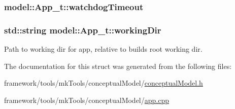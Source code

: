 \subsubsection[{\texorpdfstring{watchdog\+Timeout}{watchdogTimeout}}]{ model\+::\+App\+\_\+t\+::watchdog\+Timeout}\hypertarget{structmodel_1_1_app__t_ab1f362e168c428268f8cbf63b1fa4b49}{}\label{structmodel_1_1_app__t_ab1f362e168c428268f8cbf63b1fa4b49}
\subsubsection[{\texorpdfstring{working\+Dir}{workingDir}}]{\setlength{\rightskip}{0pt plus 5cm}std\+::string model\+::\+App\+\_\+t\+::working\+Dir}\hypertarget{structmodel_1_1_app__t_a1437ef7791144ca95e5b27a6770911db}{}\label{structmodel_1_1_app__t_a1437ef7791144ca95e5b27a6770911db}


Path to working dir for app, relative to build\textquotesingle{}s root working dir. 



The documentation for this struct was generated from the following files\+:\begin{DoxyCompactItemize}
\item 
framework/tools/mk\+Tools/conceptual\+Model/\hyperlink{conceptual_model_8h}{conceptual\+Model.\+h}\item 
framework/tools/mk\+Tools/conceptual\+Model/\hyperlink{app_8cpp}{app.\+cpp}\end{DoxyCompactItemize}
